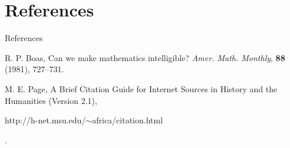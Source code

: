 \documentclass{beamer}
\begin{document}
\section{References}

\begin{frame}{References}

\begin{thebibliography}{99}
 R. P. Boas,  Can we make mathematics intelligible?  \textit{Amer. Math. Monthly}, \textbf{88} (1981), 727--731.

 M. E. Page,  A Brief Citation Guide for Internet Sources in History and the Humanities (Version 2.1),
\begin{url}http://h-net.msu.edu/$\sim$africa/citation.html\end{url}.

\end{thebibliography}

\end{frame}
\end{document}
